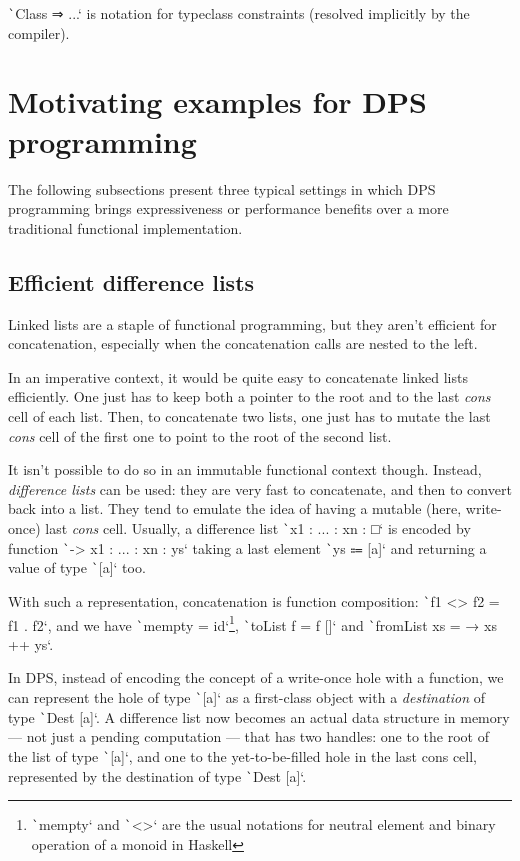 \documentclass[english]{jflart}
\begin{document}
\texttt`Class ⇒ ...` is notation for typeclass constraints (resolved implicitly by the compiler).

\section{Motivating examples for DPS programming}\label{sec:motivating-examples}

The following subsections present three typical settings in which DPS programming brings expressiveness or performance benefits over a more traditional functional implementation.

\subsection{Efficient difference lists}\label{ssec:dlist}

Linked lists are a staple of functional programming, but they aren't efficient for concatenation, especially when the concatenation calls are nested to the left.

In an imperative context, it would be quite easy to concatenate linked lists efficiently. One just has to keep both a pointer to the root and to the last \emph{cons} cell of each list. Then, to concatenate two lists, one just has to mutate the last \emph{cons} cell of the first one to point to the root of the second list.

It isn't possible to do so in an immutable functional context though. Instead, \emph{difference lists} can be used: they are very fast to concatenate, and then to convert back into a list. They tend to emulate the idea of having a mutable (here, write-once) last \emph{cons} cell. Usually, a difference list \texttt`x1 : ... : xn : □` is encoded by function \texttt`\ys -> x1 : ... : xn : ys` taking a last element \texttt`ys ⩴ [a]` and returning a value of type \texttt`[a]` too.

With such a representation, concatenation is function composition: \texttt`f1 <> f2 = f1 . f2`, and we have \texttt`mempty = id`\footnote{\texttt`mempty` and \texttt`<>` are the usual notations for neutral element and binary operation of a monoid in Haskell}, \texttt`toList f = f []` and \texttt`fromList xs = \ys → xs ++ ys`.

In DPS, instead of encoding the concept of a write-once hole with a function, we can represent the hole of type \texttt`[a]` as a first-class object with a \emph{destination} of type \texttt`Dest [a]`. A difference list now becomes an actual data structure in memory --- not just a pending computation --- that has two handles: one to the root of the list of type \texttt`[a]`, and one to the yet-to-be-filled hole in the last cons cell, represented by the destination of type \texttt`Dest [a]`.
\end{document}
